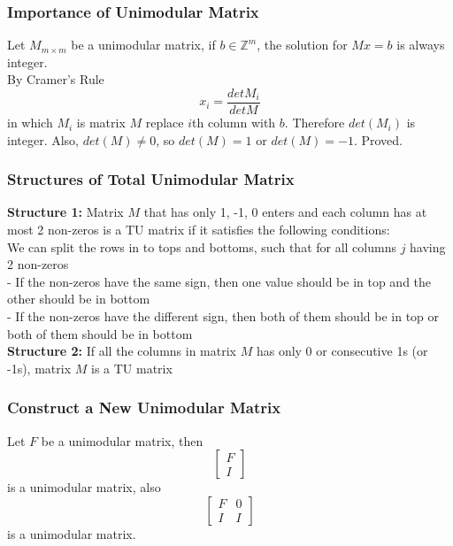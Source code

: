 				\subsubsection{Importance of Unimodular Matrix}
					Let $M_{m\times m}$ be a unimodular matrix, if $b\in \mathbb{Z}^m$, the solution for $Mx=b$ is always integer.\\
					 By Cramer's Rule
					\begin{equation}
						x_i = \frac{det{M_i}}{det{M}} 
					\end{equation}
					in which $M_i$ is matrix $M$ replace $i$th column with $b$. Therefore $det(M_i)$ is integer. Also, $det(M)\ne 0$, so $det(M)=1$ or $det(M)=-1$. Proved.

				\subsubsection{Structures of Total Unimodular Matrix}
					\textbf{Structure 1:}
						Matrix $M$ that has only 1, -1, 0 enters and each column has at most 2 non-zeros is a TU matrix if it satisfies the following conditions:\\
						We can split the rows in to tops and bottoms, such that for all columns $j$ having 2 non-zeros\\
						- If the non-zeros have the same sign, then one value should be in top and the other should be in bottom\\
						- If the non-zeros have the different sign, then both of them should be in top or both of them should be in bottom\\
					\textbf{Structure 2:}
						If all the columns in matrix $M$ has only 0 or consecutive 1s (or -1s), matrix $M$ is a TU matrix

				\subsubsection{Construct a New Unimodular Matrix}
					Let $F$ be a unimodular matrix, then
					\begin{equation}
						\left[\begin{matrix}F \\ I\end{matrix}\right] 
					\end{equation}
					is a unimodular matrix, also
					\begin{equation}
						\left[\begin{matrix}F & 0 \\ I & I\end{matrix}\right] 
					\end{equation}
					is a unimodular matrix.